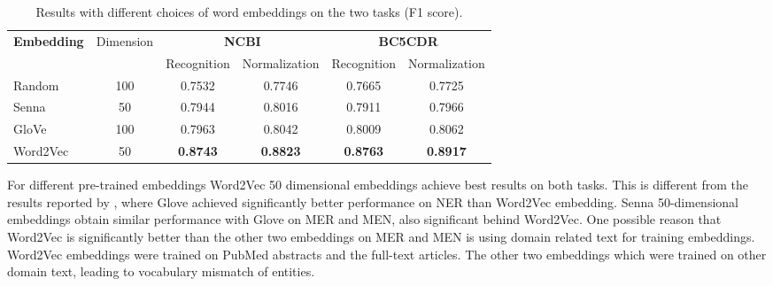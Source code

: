 \begin{table*}[tb]
	\small
	\centering
	\begin{tabular}{l|c|c|c|c|c}
		\hline
		\multirow{2}{*}{\textbf{Embedding}}& \multirow{2}{*}{Dimension}&\multicolumn{2}{c|}{\textbf{NCBI}}&\multicolumn{2}{c}{\textbf{BC5CDR}}\\
		\cline{3-6}
		\multirow{2}{*}{}&  \multirow{2}{*}{}&Recognition&Normalization&Recognition&Normalization\\
		\hline
		Random&100&0.7532&0.7746&0.7665&0.7725\\
		Senna &50&0.7944&0.8016&0.7911&0.7966\\
		GloVe &100&0.7963&0.8042&0.8009&0.8062\\
		Word2Vec&50&\textbf{0.8743}&\textbf{0.8823}&\textbf{0.8763}&\textbf{0.8917}\\
		\hline
	\end{tabular}
	\vspace{-0.1in}
	\caption{Results with different choices of word embeddings on the two tasks (F1 score).}\label{tab: embeddings}	
	\vspace{-0.1in}
\end{table*}
For different pre-trained embeddings Word2Vec 50 dimensional embeddings achieve best results on both tasks.
 This is different from the results reported by \cite{MaH16}, where Glove achieved significantly better performance on NER than Word2Vec embedding.  Senna 50-dimensional embeddings obtain similar performance with Glove on MER and MEN, also significant behind Word2Vec. 
 One possible reason that Word2Vec is significantly better than the other two embeddings on MER and MEN is using domain related text for training embeddings. Word2Vec embeddings were trained on PubMed abstracts and the full-text articles. The other two embeddings which were trained on other domain text, leading to vocabulary mismatch of entities.%

